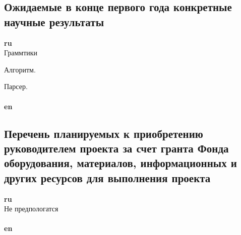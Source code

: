 \documentclass[12pt]{article}  %
\theoremstyle{remark}
\begin{document}
\subsection{Ожидаемые в конце первого года конкретные научные результаты}

\textbf{ru}\\
Граммтики

Алгоритм.

Парсер.
\\
\\
\textbf{en}\\

\subsection{Перечень планируемых к приобретению руководителем проекта за счет гранта Фонда оборудования, материалов, информационных и других ресурсов для выполнения проекта}

\textbf{ru}\\
Не предпологатся
\\
\\
\textbf{en}\\
\end{document}
